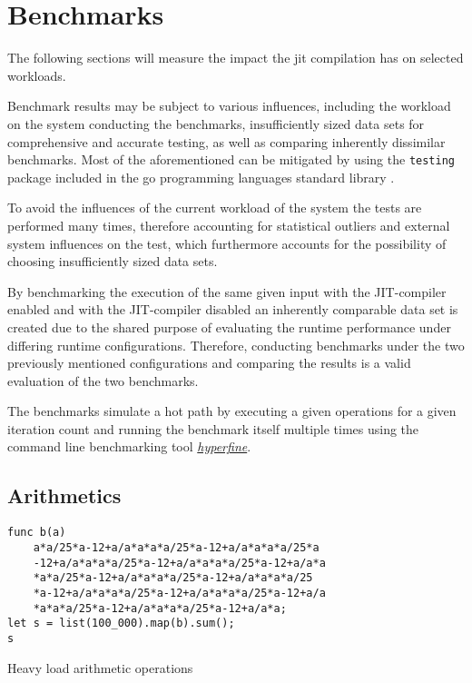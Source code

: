 \chapter{Benchmarks}

The following sections will measure the impact the jit compilation has on
selected workloads.

Benchmark results may be subject to various influences, including the workload
on the system conducting the benchmarks, insufficiently sized data sets for
comprehensive and accurate testing, as well as comparing inherently dissimilar
benchmarks. Most of the aforementioned can be mitigated by using the
\texttt{testing} package included in the go programming languages standard
library \cite{go_testing}. 

To avoid the influences of the current workload of the system the tests are
performed many times, therefore accounting for statistical outliers and
external system influences on the test, which furthermore accounts for the
possibility of choosing insufficiently sized data sets.

By benchmarking the execution of the same given input with the JIT-compiler
enabled and with the JIT-compiler disabled an inherently comparable data set is
created due to the shared purpose of evaluating the runtime performance under
differing runtime configurations. Therefore, conducting benchmarks under the
two previously mentioned configurations and comparing the results is a valid
evaluation of the two benchmarks.

The benchmarks simulate a hot path by executing a given operations for a given
iteration count and running the benchmark itself multiple times using the
command line benchmarking tool
\href{https://github.com/sharkdp/hyperfine}{\textit{hyperfine}}.


\section{Arithmetics}

\begin{listing}[H]
    \begin{verbatim}
func b(a)
    a*a/25*a-12+a/a*a*a*a/25*a-12+a/a*a*a*a/25*a
    -12+a/a*a*a*a/25*a-12+a/a*a*a*a/25*a-12+a/a*a
    *a*a/25*a-12+a/a*a*a*a/25*a-12+a/a*a*a*a/25
    *a-12+a/a*a*a*a/25*a-12+a/a*a*a*a/25*a-12+a/a
    *a*a*a/25*a-12+a/a*a*a*a/25*a-12+a/a*a;
let s = list(100_000).map(b).sum();
s
    \end{verbatim}
    \caption{Heavy load arithmetic operations}
    \label{code:benchmark-arithmetics}
\end{listing}

